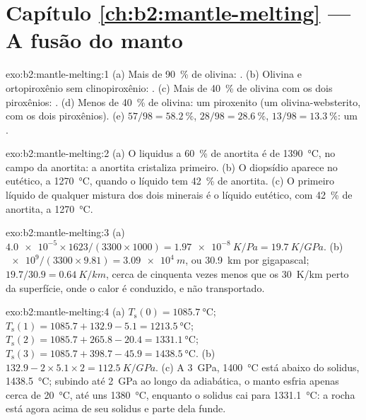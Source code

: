 \section*{Capítulo \ref{ch:b2:mantle-melting} --- A fusão do manto}

\begin{solution}{exo:b2:mantle-melting:1}
(a) Mais de \qty{90}{\percent} de olivina: . (b) Olivina e ortopiroxênio
sem clinopiroxênio: . (c) Mais de \qty{40}{\percent} de olivina com
os dois piroxênios: . (d) Menos de \qty{40}{\percent} de olivina: um piroxenito
(um olivina-websterito, com os dois piroxênios). (e) $57/98 = \qty{58.2}{\percent}$,
$28/98 = \qty{28.6}{\percent}$, $13/98 = \qty{13.3}{\percent}$: um .
\end{solution}

\begin{solution}{exo:b2:mantle-melting:2}
(a) O liquidus a \qty{60}{\percent} de anortita é de \qty{1390}{\celsius}, no
campo da anortita: a anortita cristaliza primeiro. (b) O diopsídio aparece no
eutético, a \qty{1270}{\celsius}, quando o líquido tem \qty{42}{\percent} de anortita.
(c) O primeiro líquido de qualquer mistura dos dois minerais é o líquido eutético,
com \qty{42}{\percent} de anortita, a \qty{1270}{\celsius}.
\end{solution}

\begin{solution}{exo:b2:mantle-melting:3}
(a) $\num{4.0e-5}\times1623/(3300\times1000) = \qty{1.97e-8}{K/Pa} =
\qty{19.7}{K/GPa}$. (b) $\num{e9}/(3300\times9.81) = \qty{3.09e4}{m}$, ou
\qty{30.9}{km} por gigapascal; $19.7/30.9 = \qty{0.64}{K/km}$, cerca de cinquenta vezes
menos que os \qty{30}{K/km} perto da superfície, onde o calor é conduzido, e não
transportado.
\end{solution}

\begin{solution}{exo:b2:mantle-melting:4}
(a) $T_{\mathrm s}(0) = \qty{1085.7}{\celsius}$; $T_{\mathrm s}(1) = 1085.7 +
132.9 - 5.1 = \qty{1213.5}{\celsius}$; $T_{\mathrm s}(2) = 1085.7 + 265.8 - 20.4 =
\qty{1331.1}{\celsius}$; $T_{\mathrm s}(3) = 1085.7 + 398.7 - 45.9 =
\qty{1438.5}{\celsius}$. (b) $132.9 - 2\times5.1\times2 = \qty{112.5}{K/GPa}$.
(c) A \qty{3}{GPa}, \qty{1400}{\celsius} está abaixo do solidus,
\qty{1438.5}{\celsius}; subindo até \qty{2}{GPa} ao longo da adiabática, o manto esfria apenas
cerca de \qty{20}{\celsius}, até uns \qty{1380}{\celsius}, enquanto o solidus cai para
\qty{1331.1}{\celsius}: a rocha está agora acima de seu solidus e parte dela funde.
\end{solution}

